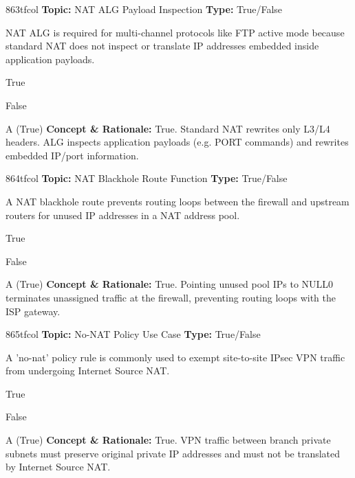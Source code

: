 \begin{qcard}{863}{tfcol}
\textcolor{darkslate!75}{\small\textbf{Topic:} NAT ALG Payload Inspection \hfill \textbf{Type:} True/False}\vspace{0.4em}\par
NAT ALG is required for multi-channel protocols like FTP active mode because standard NAT does not inspect or translate IP addresses embedded inside application payloads.
\begin{qoptions}
\item True
\item False
\end{qoptions}
\end{qcard}
\nopagebreak
\begin{explainbox}{A (True)}
\textbf{Concept \& Rationale:} True. Standard NAT rewrites only L3/L4 headers. ALG inspects application payloads (e.g. PORT commands) and rewrites embedded IP/port information.
\end{explainbox}

\begin{qcard}{864}{tfcol}
\textcolor{darkslate!75}{\small\textbf{Topic:} NAT Blackhole Route Function \hfill \textbf{Type:} True/False}\vspace{0.4em}\par
A NAT blackhole route prevents routing loops between the firewall and upstream routers for unused IP addresses in a NAT address pool.
\begin{qoptions}
\item True
\item False
\end{qoptions}
\end{qcard}
\nopagebreak
\begin{explainbox}{A (True)}
\textbf{Concept \& Rationale:} True. Pointing unused pool IPs to NULL0 terminates unassigned traffic at the firewall, preventing routing loops with the ISP gateway.
\end{explainbox}

\begin{qcard}{865}{tfcol}
\textcolor{darkslate!75}{\small\textbf{Topic:} No-NAT Policy Use Case \hfill \textbf{Type:} True/False}\vspace{0.4em}\par
A 'no-nat' policy rule is commonly used to exempt site-to-site IPsec VPN traffic from undergoing Internet Source NAT.
\begin{qoptions}
\item True
\item False
\end{qoptions}
\end{qcard}
\nopagebreak
\begin{explainbox}{A (True)}
\textbf{Concept \& Rationale:} True. VPN traffic between branch private subnets must preserve original private IP addresses and must not be translated by Internet Source NAT.
\end{explainbox}

